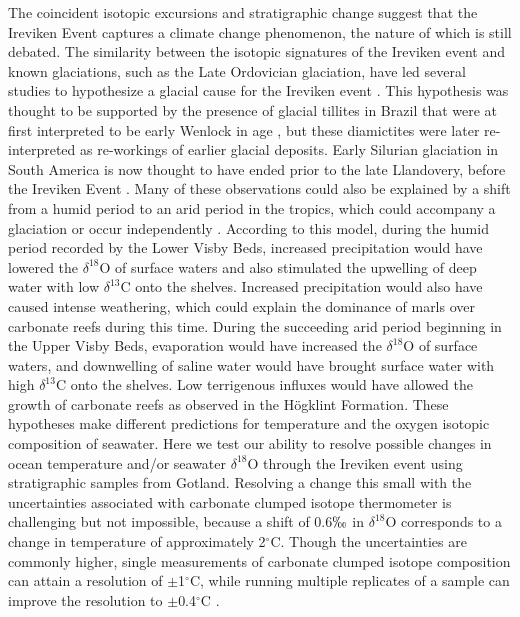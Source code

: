 \documentclass[5p, authoryear]{elsarticle}
\begin{document}
The coincident isotopic excursions and stratigraphic change suggest that the Ireviken Event captures a climate change phenomenon, the nature of which is still debated. The similarity between the isotopic signatures of the Ireviken event and known glaciations, such as the Late Ordovician glaciation, have led several studies to hypothesize a glacial cause for the Ireviken event \citep{Azmy1998, Kaljo2003, Brand2006, Calner2008}. This hypothesis was thought to be supported by the presence of glacial tillites in Brazil that were at first interpreted to be early Wenlock in age \citep{Grahn1992}, but these diamictites were later re-interpreted as re-workings of earlier glacial deposits. Early Silurian glaciation in South America is now thought to have ended prior to the late Llandovery, before the Ireviken Event \citep{DiazMartinez2007a, DiazMartinez2007b}. Many of these observations could also be explained by a shift from a humid period to an arid period in the tropics, which could accompany a glaciation or occur independently \citep{Bickert1997, Jeppsson1990, Munnecke2003, Samtleben1996}. According to this model, during the humid period recorded by the Lower Visby Beds, increased precipitation would have lowered the $\delta^{18}$O of surface waters and also stimulated the upwelling of deep water with low $\delta^{13}$C onto the shelves. Increased precipitation would also have caused intense weathering, which could explain the dominance of marls over carbonate reefs during this time. During the succeeding arid period beginning in the Upper Visby Beds, evaporation would have increased the $\delta^{18}$O of surface waters, and downwelling of saline water would have brought surface water with high $\delta^{13}$C onto the shelves. Low terrigenous influxes would have allowed the growth of carbonate reefs as observed in the H\"{o}gklint Formation. These hypotheses make different predictions for temperature and the oxygen isotopic composition of seawater. Here we test our ability to resolve possible changes in ocean temperature and/or seawater $\delta^{18}$O through the Ireviken event using stratigraphic samples from Gotland. Resolving a change this small with the uncertainties associated with carbonate clumped isotope thermometer is challenging but not impossible, because a shift of 0.6$\permil$ in $\delta^{18}$O corresponds to a change in temperature of approximately 2$^{\circ}$C. Though the uncertainties are commonly higher, single measurements of carbonate clumped isotope composition can attain a resolution of $\pm$1$^{\circ}$C, while running multiple replicates of a sample can improve the resolution to $\pm$0.4$^{\circ}$C \citep{Thiagarajan2011}.
\end{document}
